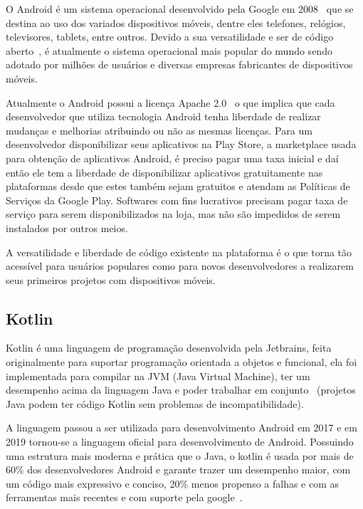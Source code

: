 O Android é um sistema operacional desenvolvido pela Google em 2008~\cite{rpt} que se destina ao uso dos variados dispositivos móveis, dentre eles telefones, relógios, televisores, tablets, entre outros.
Devido a sua versatilidade e ser de código aberto~\cite{licences_android}, é atualmente o sistema operacional mais popular do mundo sendo adotado por milhões de usuários e diversas empresas fabricantes de dispositivos móveis.

Atualmente o Android possui a licença Apache 2.0~\cite{licences_android} o que implica que cada desenvolvedor que utiliza tecnologia Android tenha liberdade de realizar mudanças e melhorias atribuindo ou não as mesmas licenças.
Para um desenvolvedor disponibilizar seus aplicativos na Play Store, a marketplace usada para obtenção de aplicativos Android, é preciso pagar uma taxa inicial e daí então ele tem a liberdade de disponibilizar aplicativos gratuitamente nas plataformas desde que estes também sejam gratuitos e atendam as Políticas de Serviços da Google Play.
Softwares com fins lucrativos precisam pagar taxa de serviço para serem disponibilizados na loja, mas não são impedidos de serem instalados por outros meios.

A versatilidade e liberdade de código existente na plataforma é o que torna tão acessível para usuários populares como para novos desenvolvedores a realizarem seus primeiros projetos com dispositivos móveis.

\subsection{Kotlin}\label{subsec:kotlin}

Kotlin é uma linguagem de programação desenvolvida pela Jetbrains, feita originalmente para suportar programação orientada a objetos e funcional, ela foi implementada para compilar na JVM (Java Virtual Machine), ter um desempenho acima da linguagem Java e poder trabalhar em conjunto~\cite{kotlin} (projetos Java podem ter código Kotlin sem problemas de incompatibilidade).

A linguagem passou a ser utilizada para desenvolvimento Android em 2017 e em 2019 tornou-se a linguagem oficial para desenvolvimento de Android.
Possuindo uma estrutura mais moderna e prática que o Java, o kotlin é usada por mais de 60\% dos desenvolvedores Android e garante trazer um desempenho maior, com um código mais expressivo e conciso, 20\% menos propenso a falhas e com as ferramentas mais recentes e com suporte pela google~\cite{android}.

